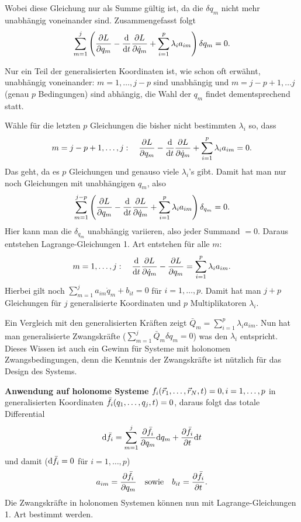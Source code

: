 Wobei diese Gleichung nur als Summe gültig ist, da die $\delta q_m$ nicht mehr unabhängig voneinander sind. Zusammengefasst folgt
\[
	\sum_{m=1}^j \left( \frac{\partial L}{\partial q_m} - \frac{\mathrm d}{\mathrm d t} \frac{\partial L}{\partial \dot{q}_m} + \sum_{i=1}^p \lambda_i a_{im} \right) \delta q_m = 0
	\text{.}
\]

Nur ein Teil der generalisierten Koordinaten ist, wie schon oft erwähnt, unabhängig voneinander: $m = 1, \dots, j - p$ sind unabhängig und $m = j - p + 1, \dots j$ (genau $p$ Bedingungen) sind abhängig, die Wahl der $q_m$ findet dementsprechend statt.

Wähle für die letzten $p$ Gleichungen die bisher nicht bestimmten $\lambda_i$ so, dass
\[
	m = j-p+1, \dots, j: 
	\quad 
	\frac{\partial L}{\partial q_m} - \frac{\mathrm d}{\mathrm d t} \frac{\partial L}{\partial \dot{q}_m} + \sum_{i=1}^p \lambda_i a_{im} = 0
	\text{.}
\]
Das geht, da es $p$ Gleichungen und genauso viele $\lambda_i$'s gibt. Damit hat man nur noch Gleichungen mit unabhängigen $q_m$, also
\[
	\sum^{j - p}_{m = 1} \left( \frac{\partial L}{\partial q_m} - \frac{\mathrm d}{\mathrm d t} \frac{\partial L}{\partial \dot{q}_m} + \sum^p_{i = 1} \lambda_i a_{im} \right) \delta_{q_m} = 0
	\text{.}
\]
Hier kann man die $\delta_{q_m}$ unabhängig variieren, also jeder Summand $=0$. Daraus entstehen Lagrange-Gleichungen 1. Art entstehen für alle $m$:
\[
	m = 1, \dots, j:
	\quad
	\frac{\mathrm d}{\mathrm d t} \frac{\partial L}{\partial \dot{q}_m} - \frac{\partial L}{\partial q_m} = \sum_{i=1}^p \lambda_i a_{im}
	\text{.}
\]
Hierbei gilt noch $\sum_{m=1}^j a_{im} \dot{q}_m + b_{it} = 0$ für $i = 1, \dots, p$. Damit hat man $j + p$ Gleichungen für $j$ generalisierte Koordinaten und $p$ Multiplikatoren $\lambda_i$.

Ein Vergleich mit den generalisierten Kräften zeigt $\bar{Q}_m = \sum_{i=1}^{p} \lambda_i a_{im}$.
Nun hat man generalisierte Zwangskräfte ($\sum_{m=1}^j \bar{Q}_m \delta q_m = 0$) was den $\lambda_i$ entspricht.
Dieses Wissen ist auch ein Gewinn für Systeme mit holonomen Zwangsbedingungen, denn die Kenntnis der Zwangskräfte ist nützlich für das Design des Systems.

\textbf{Anwendung auf holonome Systeme}
$f_i(\vec{r}_1, \dots, \vec{r}_N, t) = 0, i = 1, \dots, p$ in generalisierten Koordinaten $\bar{f}_i(q_1, \dots, q_j, t) = 0$, daraus folgt das totale Differential 
\[
	\mathrm d \bar{f}_i = \sum_{m=1}^j \frac{\partial \bar{f}_i}{\partial q_m} \mathrm d q_m + \frac{\partial \bar{f}_i}{\partial t} \mathrm d t
\]
und damit ($\mathrm d \bar{f}_i = 0$ für $i = 1, \dots, p$)
\[
	a_{im} = \frac{\partial \bar{f}_i}{\partial q_m}
	\quad \text{sowie} \quad
	b_{it} = \frac{\partial \bar{f}_i}{\partial t}
	\text{.}
\]
Die Zwangskräfte in holonomen Systemen können nun mit Lagrange-Gleichungen 1. Art bestimmt werden.

